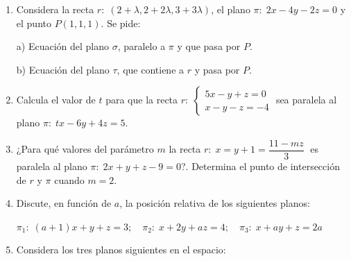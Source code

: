 \begin{enumerate}
\vspace{2mm} 

\item Considera la recta $r:\; (2+\lambda,2+2\lambda,3+3\lambda)$, el plano $\pi:\; 2x-4y-2z=0$ y el punto $P(1,1,1)$. Se pide:

a) Ecuación del plano $\sigma$, paralelo a $\pi$ y que pasa por $P$.

b) Ecuación del plano $\tau$, que contiene a $r$ y pasa por $P$.

\vspace{2mm} 

\item Calcula el valor de $t$ para que la recta $r:\; \begin{cases} 5x-y+z=0\\x-y-z=-4\end{cases}$ sea paralela al plano $\pi:\; tx-6y+4z=5$.

\vspace{2mm} 

\item ¿Para qué valores del parámetro $m$ la recta $r:\; x=y+1=\dfrac{11-mz}{3}\;$ es paralela al plano $\pi:\;2x+y+z-9=0$?. Determina el punto de intersección de $r$ y $\pi$ cuando $m=2$.

\vspace{2mm} 

\item Discute, en función de $a$, la posición relativa de los siguientes planos:

$\pi_1:\; (a+1)x+y+z=3;\quad \pi_2:\; x+2y+az=4;\quad \pi_3:\; x+ay+z=2a$

\vspace{2mm} 


\item Considera los tres planos siguientes en el espacio:


\end{enumerate}
